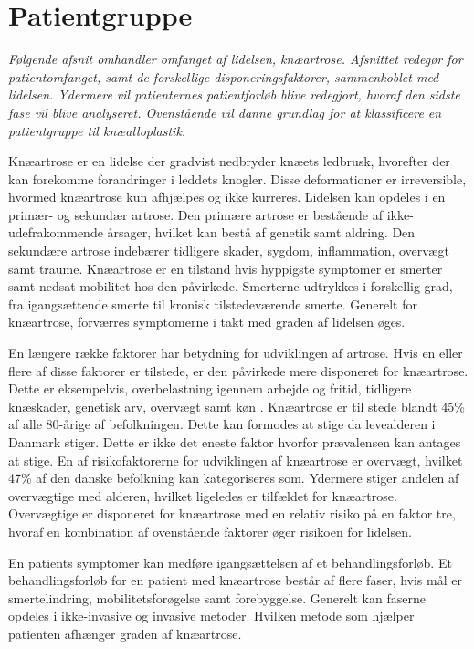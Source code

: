 \section{Patientgruppe}
\textit{Følgende afsnit omhandler omfanget af lidelsen, knæartrose. Afsnittet redegør for patientomfanget, samt de forskellige disponeringsfaktorer, sammenkoblet med lidelsen. Ydermere vil patienternes patientforløb blive redegjort, hvoraf den sidste fase vil blive analyseret. Ovenstående vil danne grundlag for at klassificere en patientgruppe til knæalloplastik.}

Knæartrose er en lidelse der gradvist nedbryder knæets ledbrusk, hvorefter der kan forekomme forandringer i leddets knogler. Disse deformationer er irreversible, hvormed knæartrose kun afhjælpes og ikke kurreres. Lidelsen kan opdeles i en primær- og sekundær artrose. Den primære artrose er bestående af ikke-udefrakommende årsager, hvilket kan bestå af genetik samt aldring. Den sekundære artrose indebærer tidligere skader, sygdom, inflammation, overvægt samt traume. Knæartrose er en tilstand hvis hyppigste symptomer er smerter samt nedsat mobilitet hos den påvirkede. Smerterne udtrykkes i forskellig grad, fra igangsættende smerte til kronisk tilstedeværende smerte. Generelt for knæartrose, forværres symptomerne i takt med graden af lidelsen øges. \citep{Lind2016b}

En længere række faktorer har betydning for udviklingen af artrose. Hvis en eller flere af disse faktorer er tilstede, er den påvirkede mere disponeret for knæartrose. Dette er eksempelvis, overbelastning igennem arbejde og fritid, tidligere knæskader, genetisk arv, overvægt samt køn \citep{brostrom2012}. Knæartrose er til stede blandt 45\% af alle 80-årige af befolkningen. Dette kan formodes at stige da levealderen i Danmark stiger. Dette er ikke det eneste faktor hvorfor prævalensen kan antages at stige. En af risikofaktorerne for udviklingen af knæartrose er overvægt, hvilket 47\% af den danske befolkning kan kategoriseres som. Ydermere stiger andelen af overvægtige med alderen, hvilket ligeledes er tilfældet for knæartrose. Overvægtige er disponeret for knæartrose med en relativ risiko på en faktor tre, hvoraf en kombination af ovenstående faktorer øger risikoen for lidelsen. \citep{Vestergaard2014} \citep{Vestergaard2016} \citep{Lind2016} \citep{Lind2016b}

En patients symptomer kan medføre igangsættelsen af et behandlingsforløb. Et behandlingsforløb for en patient med knæartrose består af flere faser, hvis mål er smertelindring, mobilitetsforøgelse samt forebyggelse. Generelt kan faserne opdeles i ikke-invasive og invasive metoder. Hvilken metode som hjælper patienten afhænger graden af knæartrose.

